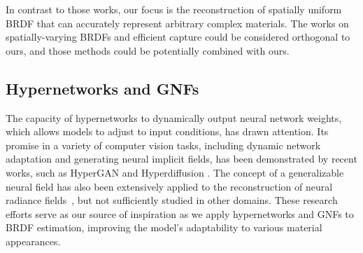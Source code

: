 In contrast to those works, our focus is the reconstruction of spatially uniform BRDF that can accurately represent arbitrary complex materials. The works on spatially-varying BRDFs and efficient capture could be considered orthogonal to ours, and those methods could be potentially combined with ours. 


\subsection{Hypernetworks and GNFs}
The capacity of hypernetworks to dynamically output neural network weights, which allows models to adjust to input conditions, has drawn attention. Its promise in a variety of computer vision tasks, including dynamic network adaptation and generating neural implicit fields, has been demonstrated by recent works, such as HyperGAN \cite{ratzlaff2019hypergan} and Hyperdiffusion \cite{erkocc2023hyperdiffusion}.
The concept of a generalizable neural field has also been extensively applied to the reconstruction of neural radiance fields~\cite{wang2022attention, yang2023contranerf}, but not sufficiently studied in other domains.
These research efforts serve as our source of inspiration as we apply hypernetworks and GNFs to BRDF estimation, improving the model's adaptability to various material appearances.


